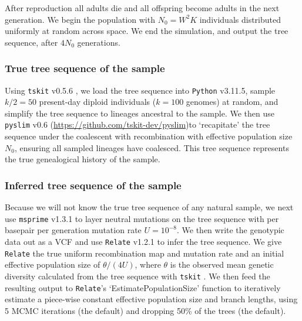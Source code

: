 \documentclass[12pt]{article}
\begin{document}
After reproduction all adults die and all offspring become adults in the next generation.
We begin the population with $N_0=W^2 K$ individuals distributed uniformly at random across space.
We end the simulation, and output the tree sequence, after $4N_0$ generations.


\subsubsection*{True tree sequence of the sample}

Using \texttt{tskit} v0.5.6 \citep{kelleher2018efficient}, we load the tree sequence into \texttt{Python} v3.11.5, sample $k/2=50$ present-day diploid individuals ($k=100$ genomes) at random, and simplify the tree sequence to lineages ancestral to the sample.
We then use \texttt{pyslim} v0.6 (\url{https://github.com/tskit-dev/pyslim})to `recapitate' the tree sequence under the coalescent with recombination \citep{hudson2002generating} with effective population size $N_0$, ensuring all sampled lineages have coalesced.
This tree sequence represents the true genealogical history of the sample.

\subsubsection*{Inferred tree sequence of the sample}

Because we will not know the true tree sequence of any natural sample, we next use \texttt{msprime} v1.3.1 \citep{kelleher2016efficient} to layer neutral mutations on the tree sequence with per basepair per generation mutation rate $U=10^{-8}$.
We then write the genotypic data out as a VCF and use \texttt{Relate} v1.2.1 \citep{speidel2019method} to infer the tree sequence.
We give \texttt{Relate} the true uniform recombination map and mutation rate and an initial effective population size of $\theta/(4U)$, where $\theta$ is the observed mean genetic diversity calculated from the tree sequence with \texttt{tskit} \citep{ralph2020efficiently}.
We then feed the resulting output to \texttt{Relate}'s `EstimatePopulationSize' function to iteratively estimate a piece-wise constant effective population size and branch lengths, using 5 MCMC iterations (the default) and dropping 50\% of the trees (the default).
\end{document}
